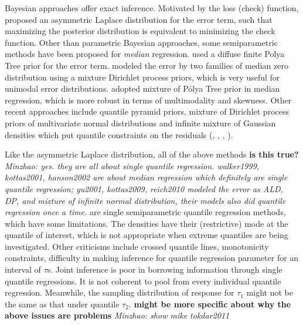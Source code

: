 \documentclass[12pt]{article}
\newcommand{\polya}{P\'{o}lya}
\begin{document}
Bayesian approaches offer exact
inference. Motivated by the loss (check) function, \citet{yu2001}
proposed an asymmetric Laplace distribution for the error term,
such that maximizing the posterior distribution  is equivalent to
minimizing the check function. Other than parametric Bayesian
approaches, some semiparametric methods have been proposed for {\em median}
regression. \citet{walker1999}  used a diffuse finite Polya Tree prior
for the error term. \citet{kottas2001}
modeled the error by two families of median zero distribution using a 
mixture Dirichlet process priors, which is very useful for unimodal
error distributions. \citet{hanson2002}
adopted mixture of \polya{} Tree prior in median regression,
which is
more robust in terms of multimodality and skewness. Other recent approaches
include quantile pyramid priors, mixture of Dirichlet process priors
of multivariate normal distributions and infinite mixture of Gaussian
densities which put quantile constraints on the residuals
(\citet{hjort2007}, \citet{hjort2009}, \citet{kottas2009},
\citet{reich2010}). 

Like the asymmetric Laplace distribution, all of the above methods
{\bf is this true?} {\it Minzhao: yes. they are all about single
  quantile regression. walker1999, kottas2001, hanson2002 are about
  median regression which definitely are single quantile regression;
  yu2001, kottas2009, reich2010 modeled the error as ALD, DP, and
  mixture of infinite normal distribution, their models also did
  quantile regression once a time. }are single semiparametric
quantile regression  methods,
which have some limitations. The densities have their (restrictive) mode at
the quantile of interest, which is not appropriate when extreme
quantiles are being investigated. Other criticisms include crossed
quantile lines, monotonicity constraints, difficulty in making
inference for quantile regression parameter for an interval of
$\tau$s. Joint inference is poor in borrowing information through
single quantile regressions. It is not coherent to pool from every
individual quantile regression. Meanwhile, the sampling distribution
of response for $\tau_1$ might not be the same as that under quantile
$\tau_2$. {\bf might be more specific about why the above issues are
  problems} {\it Minzhao: show mike tokdar2011}
\end{document}
